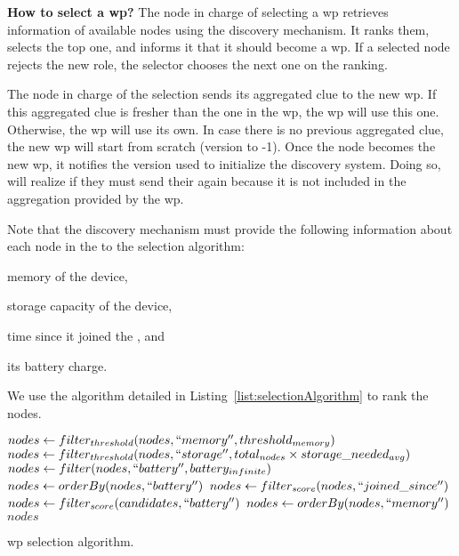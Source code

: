 \noindent\textbf{How to select a \acs{wp}?}
The node in charge of selecting a \ac{wp} retrieves information of available nodes using the discovery mechanism.
It ranks them, selects the top one, and informs it that it should become a \ac{wp}.
If a selected node rejects the new role, the selector chooses the next one on the ranking.

The node in charge of the selection sends its aggregated clue to the new \ac{wp}.
If this aggregated clue is fresher than the one in the \ac{wp}, the \ac{wp} will use this one.
Otherwise, the \ac{wp} will use its own.
In case there is no previous aggregated clue, the new \ac{wp} will start from scratch (version to -1).
Once the node becomes the new \ac{wp}, it notifies the version used to initialize the discovery system.
Doing so, \providers{} will realize if they must send their \clue{} again because it is not included in the aggregation provided by the \ac{wp}.

Note that the discovery mechanism must provide the following information about each node in the \Space{} to the selection algorithm:
\begin{enumerate*}[label=\itshape(\arabic*\upshape)]
  \item memory of the device,
  \item storage capacity of the device,
  \item time since it joined the \Space{}, and %
  \item its battery charge.
\end{enumerate*}
We use the algorithm detailed in Listing~\ref{list:selectionAlgorithm} to rank the nodes.

\begin{listing}
  \begin{algorithmic}[1]
  \State $nodes \gets filter_{threshold}(nodes, ``memory'', threshold_{memory})$
  \State $nodes \gets filter_{threshold}(nodes, ``storage'', total_{nodes} \times storage\_needed_{avg})$
    \State $nodes \gets filter(nodes, ``battery'', battery_{infinite})$
    \State $nodes \gets orderBy(nodes, ``battery'')$
  \Else
      \State $nodes \gets filter_{score}(nodes, ``joined\_since'')$
    \EndIf
    \State $nodes \gets filter_{score}(candidates, ``battery'')$
    \State $nodes \gets orderBy(nodes, ``memory'')$
  \EndIf
  \State \Return $nodes$
  \end{algorithmic}
  \caption[\acl{wp} selection algorithm]{\acl{wp} selection algorithm.}
  \label{list:selectionAlgorithm}
\end{listing}

